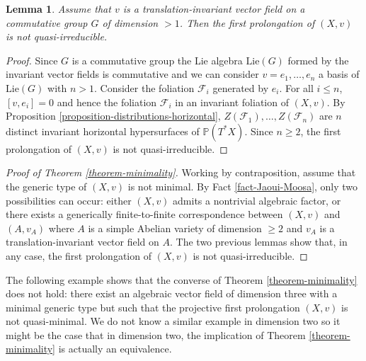 \documentclass[12pt]{amsart}
\renewcommand{\P}{\mathbb{P}}
\theoremstyle{definition}
\theoremstyle{plain}
\newtheorem{lemma}[definition]{Lemma}
\theoremstyle{exampstyle}
\theoremstyle{exampstyle}\newtheorem{thmxbis}{Theorem}
\numberwithin{equation}{section}
\theoremstyle{remark}
\begin{document}
\begin{lemma} \label{lemma-commutaitve invariant}
Assume that $v$ is a translation-invariant vector field on a commutative group $G$ of dimension $> 1$. Then the first prolongation of $(X,v)$ is not quasi-irreducible. 
\end{lemma} 

\begin{proof} 
Since $G$ is a commutative group the Lie algebra $\mathrm{Lie}(G)$ formed by the invariant vector fields is commutative and we can consider $v = e_1,\ldots, e_n$ a basis of $\mathrm{Lie}(G)$ with $n > 1$. 
Consider the foliation $\mathcal F_i$ generated by $e_i$. For all $i \leq n$, $[v,e_i] = 0$ and hence the foliation $\mathcal F_i$ in an invariant foliation of $(X,v)$. By Proposition \ref{proposition-distributions-horizontal}, $Z(\mathcal F_1),\ldots, Z(\mathcal F_n)$ are $n$ distinct invariant horizontal hypersurfaces of $\P(T^\ast X)$. Since $n \geq 2$, the first prolongation of  $(X,v)$ is not quasi-irreducible. 
\end{proof} 


\begin{proof}[Proof of Theorem \ref{theorem-minimality}]
Working by contraposition, assume that the generic type of $(X,v)$ is not minimal. By Fact \ref{fact-Jaoui-Moosa}, only two possibilities can occur: either $(X,v)$ admits a nontrivial algebraic factor, or there exists a generically finite-to-finite correspondence between $(X,v)$ and $(A,v_A)$ where $A$ is a simple Abelian variety of dimension $\geq 2$ and $v_A$ is a translation-invariant vector field on $A$. The two previous lemmas show that, in any case, the first prolongation of $(X,v)$ is not quasi-irreducible.
\end{proof} 


The following example shows that the converse of Theorem \ref{theorem-minimality} does not hold: there exist an algebraic vector field of dimension three with a minimal generic type but such that the projective first prolongation $(X,v)$ is not quasi-minimal. We do not know a similar example in dimension two so it might be the case that in dimension two, the implication of Theorem \ref{theorem-minimality} is actually an equivalence.
\end{document}
